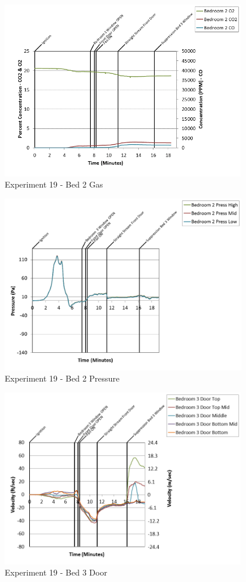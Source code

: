 \documentclass{article}
\begin{document}
\begin{appendices}
\begin{figure}[h!]
	\centering
	\includegraphics[height=3.05in]{0_Images/Results_Charts/Exp_19_Charts/Bed2Gas.png}
	\caption{Experiment 19 - Bed 2 Gas}
\end{figure}

\clearpage

\begin{figure}[h!]
	\centering
	\includegraphics[height=3.05in]{0_Images/Results_Charts/Exp_19_Charts/Bed2Pressure.png}
	\caption{Experiment 19 - Bed 2 Pressure}
\end{figure}


\begin{figure}[h!]
	\centering
	\includegraphics[height=3.05in]{0_Images/Results_Charts/Exp_19_Charts/Bed3Door.png}
	\caption{Experiment 19 - Bed 3 Door}
\end{figure}


\end{appendices}
\end{document}
